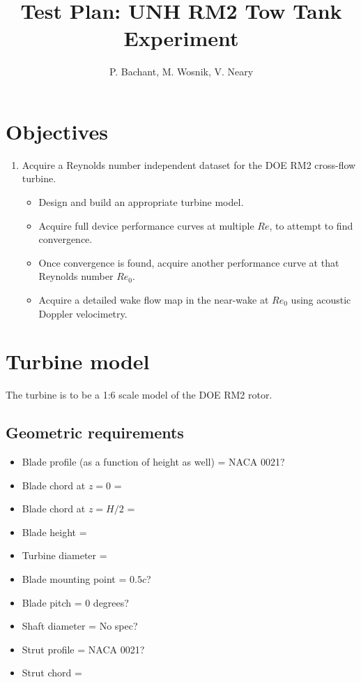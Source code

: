 \documentclass[10pt,a4paper]{article}
\author{P. Bachant, M. Wosnik, V. Neary}
\title{Test Plan: UNH RM2 Tow Tank Experiment}
\begin{document}
\maketitle
\tableofcontents

\section{Objectives}

\begin{enumerate}
\item
  {Acquire a Reynolds number independent dataset for the DOE RM2 cross-flow
  turbine.}
	\begin{itemize}
	\item
	  {Design and build an appropriate turbine model.}
	\item
	  {Acquire full device performance curves at multiple $Re$, to attempt to
	  find convergence.}
	\item
	  {Once convergence is found, acquire another performance curve at that
	  Reynolds number $Re_0$.}
	\item
	  {Acquire a detailed wake flow map in the near-wake at $Re_0$ using
	  acoustic Doppler velocimetry.}
	\end{itemize}
\end{enumerate}

\section{Turbine model}

{The turbine is to be a 1:6 scale model of the DOE RM2 rotor. }

\subsection{Geometric requirements}

\begin{itemize}
\item
  {Blade profile (as a function of height as well) = NACA 0021?}
\item
  {Blade chord at $z=0$ = }
\item
  {Blade chord at $z = H/2$ = }
\item
  {Blade height = }
\item
  {Turbine diameter = }
\item
  {Blade mounting point = $0.5c$?}
\item
  {Blade pitch = 0 degrees?}
\item
  {Shaft diameter = No spec?}
\item
  {Strut profile = NACA 0021?}
\item
  {Strut chord = }
\end{itemize}
\end{document}
